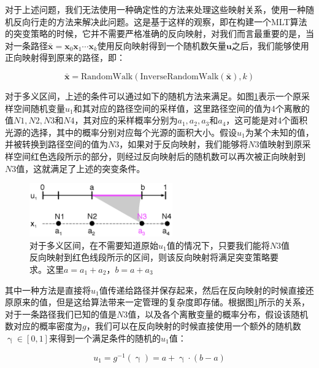 对于上述问题，我们无法使用一种确定性的方法来处理这些映射关系，\cite{a:ReversibleJumpMetropolisLightTransportusingInverseMappings,a:ChartedMetropolisLightTransport}使用一种随机反向行走的方法来解决此问题。这是基于这样的观察，即在构建一个MLT算法的突变策略的时候，它并不需要严格准确的反向映射，对我们而言最重要的是，当对一条路径$\bar{\mathbf{x}}=\mathbf{x}_0\mathbf{x}_1\cdots\mathbf{x}_k$使用反向映射得到一个随机数矢量$\mathbf{u}$之后，我们能够使用正向映射得到原来的路径，即：

\begin{equation}
	\bar{\mathbf{x}}=\text{RandomWalk}(\text{InverseRandomWalk}(\bar{\mathbf{x}}),k)
\end{equation}

对于多义区间，上述的条件可以通过如下的随机方法来满足。如图\ref{f:mlt-intervals}表示一个原采样空间随机变量$u_1$和其对应的路径空间的采样值，这里路径空间的值为4个离散的值$N1,N2,N3$和$N4$，其对应的采样概率分别为$a_1,a_2,a_3$和$a_4$，这可能是对4个面积光源的选择，其中的概率分别对应每个光源的面积大小。假设$u_1$为某个未知的值，并被转换到路径空间的值为$N3$，如果对于反向映射，我们能够将$N3$值映射到原采样空间红色选段所示的部分，则经过反向映射后的随机数可以再次被正向映射到$N3$值，这就满足了上述的突变条件。

\begin{figure}
	\sidecaption
	\includegraphics[width=0.55\textwidth]{figures/mlt/intervals}
	\caption{对于多义区间，在不需要知道原始$u_1$值的情况下，只要我们能将$N3$值反向映射到红色线段所示的区间，则该反向映射将满足突变策略要求。这里$a=a_1+a_2$，$b=a+a_3$}
	\label{f:mlt-intervals}
\end{figure}

其中一种方法是直接将$u_1$值传递给路径并保存起来，然后在反向映射的时候直接还原原来的值，但是这给算法带来一定管理的复杂度即存储。根据图\ref{f:mlt-intervals}所示的关系，对于一条路径我们已知的值是$N3$值，以及各个离散变量的概率分布，假设该随机数对应的概率密度为$g$，我们可以在反向映射的时候直接使用一个额外的随机数$\upgamma\in[0,1]$来得到一个满足条件的随机的$u_1$值：

\begin{equation}\label{e:mlt-intervals-1}
	u_1=g^{-1}(\upgamma)=a+\upgamma\cdot(b-a)
\end{equation}

